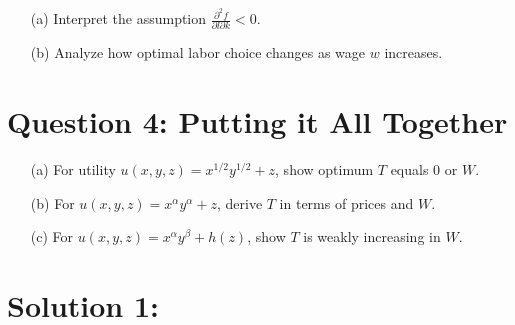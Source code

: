 \documentclass[10pt, a4paper]{article}
\begin{document}
\begin{enumerate}
    \item[(a)] Interpret the assumption $\frac{\partial^2 f}{\partial l \partial k} < 0$.
    \item[(b)] Analyze how optimal labor choice changes as wage $w$ increases.
\end{enumerate}

\section*{Question 4: Putting it All Together}

\begin{enumerate}
    \item[(a)] For utility $u(x, y, z) = x^{1/2} y^{1/2} + z$, show optimum $T$ equals 0 or $W$.
    \item[(b)] For $u(x, y, z) = x^\alpha y^\alpha + z$, derive $T$ in terms of prices and $W$.
    \item[(c)] For $u(x, y, z) = x^\alpha y^\beta + h(z)$, show $T$ is weakly increasing in $W$.
\end{enumerate}

\section*{Solution 1:}
\end{document}

